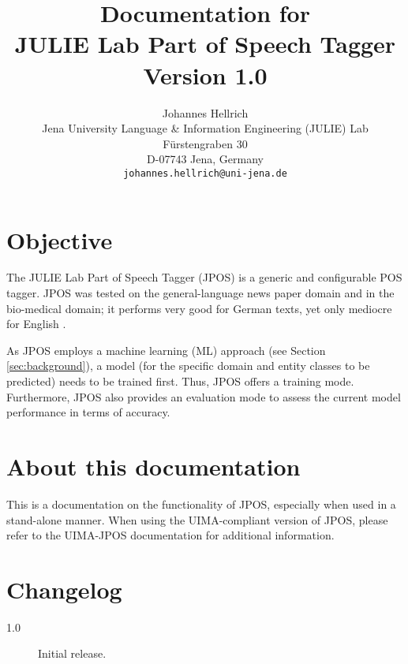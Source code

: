 \documentclass[11pt,a4paper,halfparskip]{scrartcl}
\begin{document}
\title{\small{Documentation for}\\\huge JULIE Lab Part of Speech Tagger\\\vspace{3mm}\small{Version 1.0}}


\author{\normalsize Johannes Hellrich\\
  \normalsize  Jena University Language \& Information Engineering (JULIE) Lab\\
  \normalsize F\"urstengraben 30 \\
  \normalsize D-07743 Jena, Germany\\
  {\normalsize \tt johannes.hellrich@uni-jena.de} }

\date{}

\maketitle



\section{Objective}
\label{sec_objective}


The JULIE Lab Part of Speech Tagger (JPOS) is a generic and configurable
POS tagger. JPOS was tested on the general-language news paper domain and in the bio-medical domain; it performs very good for German texts, yet only mediocre for English \cite{hellrich15}.

As JPOS employs a machine learning (ML) approach (see Section
\ref{sec:background}), a model (for the specific domain and entity
classes to be predicted) needs to be trained first. Thus, JPOS offers
a training mode. Furthermore, JPOS also provides an evaluation
mode to assess the current model performance in terms of accuracy.
 
\section{About this documentation}
This is a documentation on the functionality of JPOS, especially when
used in a stand-alone manner. When using the UIMA-compliant version of
JPOS, please refer to the UIMA-JPOS documentation for additional
information.

\section{Changelog}
\begin{description}
\item[1.0] Initial release.
\end{description}
\end{document}
